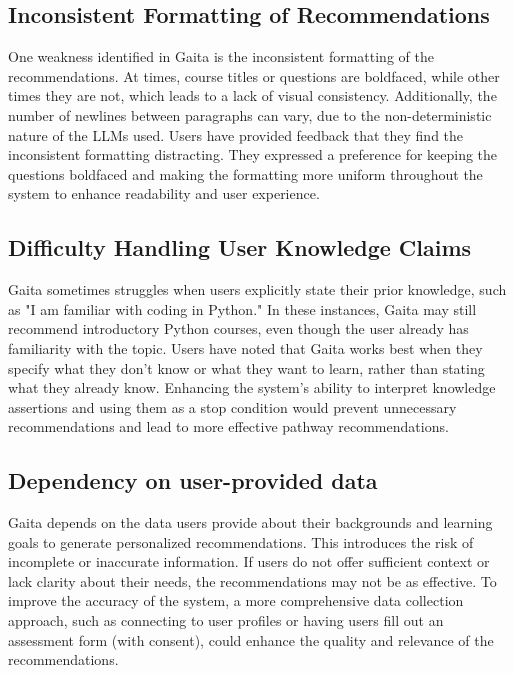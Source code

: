 \subsection{Inconsistent Formatting of Recommendations}

One weakness identified in Gaita is the inconsistent formatting of the recommendations. At times, course titles or questions are boldfaced, while other times they are not, which leads to a lack of visual consistency. Additionally, the number of newlines between paragraphs can vary, due to the non-deterministic nature of the LLMs used. Users have provided feedback that they find the inconsistent formatting distracting. They expressed a preference for keeping the questions boldfaced and making the formatting more uniform throughout the system to enhance readability and user experience.

\subsection{Difficulty Handling User Knowledge Claims}

Gaita sometimes struggles when users explicitly state their prior knowledge, such as "I am familiar with coding in Python." In these instances, Gaita may still recommend introductory Python courses, even though the user already has familiarity with the topic. Users have noted that Gaita works best when they specify what they don't know or what they want to learn, rather than stating what they already know. Enhancing the system’s ability to interpret knowledge assertions and using them as a stop condition would prevent unnecessary recommendations and lead to more effective pathway recommendations.

\subsection{Dependency on user-provided data}

Gaita depends on the data users provide about their backgrounds and learning goals to generate personalized recommendations. This introduces the risk of incomplete or inaccurate information. If users do not offer sufficient context or lack clarity about their needs, the recommendations may not be as effective. To improve the accuracy of the system, a more comprehensive data collection approach, such as connecting to user profiles or having users fill out an assessment form (with consent), could enhance the quality and relevance of the recommendations.

